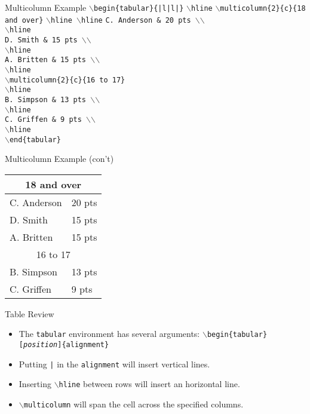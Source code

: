 \documentclass[pdf]{prosper}
\begin{document}
\begin{slide}{Multicolumn Example}
	\texttt{$\backslash$begin\{tabular\}\{|l|l|\}}
	\texttt{$\backslash$hline}
	\texttt{$\backslash$multicolumn\{2\}\{c\}\{18 and over\}}
	\texttt{$\backslash$hline $\backslash$hline}
	\texttt{C. Anderson \& 20 pts $\backslash$$\backslash$} \\
	\texttt{$\backslash$hline} \\
	\texttt{D. Smith \& 15 pts $\backslash$$\backslash$} \\
	\texttt{$\backslash$hline} \\
	\texttt{A. Britten \& 15 pts $\backslash$$\backslash$} \\
	\texttt{$\backslash$hline} \\
	\texttt{$\backslash$multicolumn\{2\}\{c\}\{16 to 17\}} \\
	\texttt{$\backslash$hline} \\
	\texttt{B. Simpson \& 13 pts $\backslash$$\backslash$} \\
	\texttt{$\backslash$hline} \\
	\texttt{C. Griffen \& 9 pts $\backslash$$\backslash$} \\
	\texttt{$\backslash$hline} \\
	\texttt{$\backslash$end\{tabular\}}
\end{slide}
\begin{slide}{Multicolumn Example (con't)}
	\begin{tabular}{|l|l|}
	\hline
	\multicolumn{2}{|c|}{18 and over} \\
	\hline
	C. Anderson & 20 pts \\
	\hline
	D. Smith & 15 pts \\
	\hline
	A. Britten & 15 pts \\
	\hline
	\multicolumn{2}{|c|}{16 to 17} \\
	\hline
	B. Simpson & 13 pts \\
	\hline
	C. Griffen & 9 pts \\
	\hline
	\end{tabular}
\end{slide}
\begin{slide}{Table Review}
	\begin{itemize}
		\item The \texttt{tabular} environment has several arguments: \texttt{$\backslash$begin\{tabular\}[\textit{position}]\{alignment\}}
		\item Putting \texttt{|} in the \texttt{alignment} will insert vertical lines.
		\item Inserting \texttt{$\backslash$hline} between rows will insert an horizontal line.
		\item \texttt{$\backslash$multicolumn} will span the cell across the specified columns.
	\end{itemize}
\end{slide}
\end{document}
